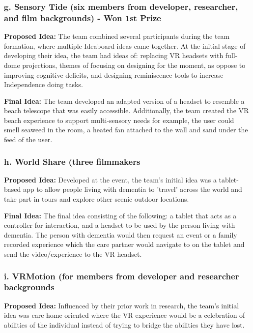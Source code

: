 \subsubsection{g. Sensory Tide (six members from developer, researcher, and film backgrounds) - Won 1st Prize}
\label{sec:senosryTide}

\textbf{Proposed Idea:} The team combined several participants during the team formation, where multiple Ideaboard ideas came together. At the initial stage of developing their idea, the team had ideas of: replacing VR headsets with full-dome projections, themes of focusing on designing for the moment, as oppose to improving cognitive deficits, and designing reminiscence tools to increase Independence doing tasks.

\textbf{Final Idea:} The team developed an adapted version of a headset to resemble a beach telescope that was easily accessible. Additionally, the team created the VR beach experience to support multi-sensory needs for example, the user could smell seaweed in the room, a heated fan attached to the wall and sand under the feed of the user. 

\subsubsection{h. World Share (three filmmakers}
\label{sec:WorldShare}

\textbf{Proposed Idea:} Developed at the event, the team's initial idea was a tablet-based app to allow people living with dementia to 'travel' across the world and take part in tours and explore other scenic outdoor locations.

\textbf{Final Idea:} The final idea consisting of the following: a tablet that acts as a controller for interaction, and a headset to be used by the person living with dementia. The person with dementia would then request an event or a family recorded experience which the care partner would navigate to on the tablet and send the video/experience to the VR headset.

\subsubsection{i. VRMotion (for members from developer and researcher backgrounds}
\label{VRMotion}
\textbf{Proposed Idea:} Influenced by their prior work in research, the team's initial idea was care home oriented where the VR experience would be a celebration of abilities of the individual instead of trying to bridge the abilities they have lost. 

